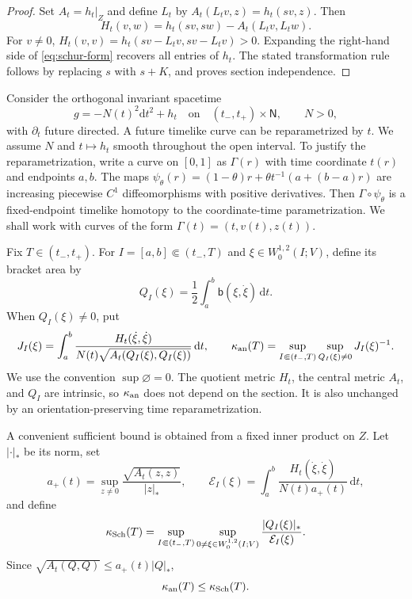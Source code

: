 \documentclass[10pt,a4paper]{article}
\numberwithin{equation}{section}
\theoremstyle{definition}
\theoremstyle{remark}
\newcommand{\dd}{\mathrm d}
\begin{document}
\begin{proof}
Set $A_t=h_t|_Z$ and define $L_t$ by
$A_t(L_tv,z)=h_t(sv,z)$.  Then
\[
 H_t(v,w)=h_t(sv,sw)-A_t(L_tv,L_tw).
\]
For $v\ne0$,
$H_t(v,v)=h_t(sv-L_tv,sv-L_tv)>0$.  Expanding the right-hand side of
\eqref{eq:schur-form} recovers all entries of $h_t$.  The stated
transformation rule follows by replacing $s$ with $s+K$, and proves section
independence.
\end{proof}

Consider the orthogonal invariant spacetime
\begin{equation}
 g=-N(t)^2\dd t^2+h_t
 \quad\text{on}\quad (t_-,t_+)\times\mathsf N,
 \qquad N>0,
 \label{eq:two-step-spacetime}
\end{equation}
with $\partial_t$ future directed.  A future timelike curve can be
reparametrized by $t$.  We assume $N$ and $t\mapsto h_t$ smooth throughout
the open interval.  To justify the reparametrization, write a curve on
$[0,1]$ as $\Gamma(r)$ with time coordinate $t(r)$ and endpoints $a,b$.
The maps
$\psi_\theta(r)=(1-\theta)r+\theta t^{-1}(a+(b-a)r)$ are increasing
piecewise $C^1$ diffeomorphisms with positive derivatives.
Then $\Gamma\circ\psi_\theta$ is a fixed-endpoint timelike homotopy to
the coordinate-time parametrization.  We shall work with curves of the form
$\Gamma(t)=(t,v(t),z(t))$.

Fix $T\in(t_-,t_+)$.  For $I=[a,b]\Subset(t_-,T)$ and
$\xi\in W^{1,2}_0(I;V)$, define its bracket area by
\begin{equation}
 Q_I(\xi)=\frac12\int_a^b\mathsf b(\xi,\dot\xi)\,\dd t.
 \label{eq:bracket-area}
\end{equation}
When $Q_I(\xi)\ne0$, put
\begin{equation}
 J_I(\xi)=\int_a^b
 \frac{H_t(\dot\xi,\dot\xi)}
 {N(t)\sqrt{A_t(Q_I(\xi),Q_I(\xi))}}\,\dd t,
 \qquad
 \kappa_{\rm an}(T)=
 \sup_{I\Subset(t_-,T)}\sup_{Q_I(\xi)\ne0}J_I(\xi)^{-1}.
 \label{eq:kappa-an}
\end{equation}
We use the convention $\sup\varnothing=0$.  The quotient metric $H_t$, the
central metric $A_t$, and $Q_I$ are intrinsic, so $\kappa_{\rm an}$ does not
depend on the section.  It is also unchanged by an orientation-preserving
time reparametrization.

A convenient sufficient bound is obtained from a fixed inner product on
$Z$.  Let $|\cdot|_*$ be its norm, set
\begin{equation}
 a_+(t)=\sup_{z\ne0}\frac{\sqrt{A_t(z,z)}}{|z|_*},
 \qquad
 \mathcal E_I(\xi)=\int_a^b
 \frac{H_t(\dot\xi,\dot\xi)}{N(t)a_+(t)}\,\dd t,
 \label{eq:computable-energy}
\end{equation}
and define
\begin{equation}
 \kappa_{\rm Sch}(T)=
 \sup_{I\Subset(t_-,T)}\sup_{0\ne\xi\in W^{1,2}_0(I;V)}
 \frac{|Q_I(\xi)|_*}{\mathcal E_I(\xi)}.
 \label{eq:kappa-schur}
\end{equation}
Since $\sqrt{A_t(Q,Q)}\le a_+(t)|Q|_*$,
\begin{equation}
 \kappa_{\rm an}(T)\le\kappa_{\rm Sch}(T).
 \label{eq:kappa-comparison}
\end{equation}
\end{document}

